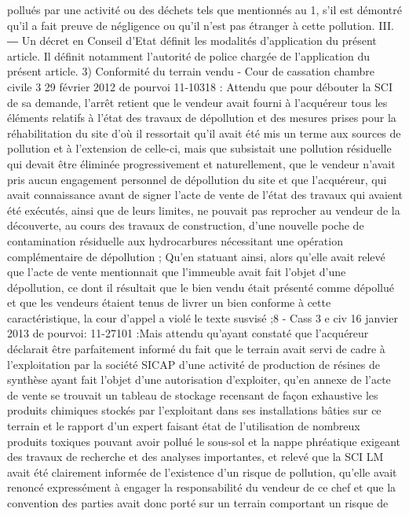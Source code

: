 \documentclass[11pt,a4paper]{report}
\begin{document}
	pollués par une activité ou des déchets tels que mentionnés au 1\degre , s'il est démontré qu'il a fait preuve de
	négligence ou qu'il n'est pas étranger à cette pollution.
	III. ― Un décret en Conseil d'Etat définit les modalités d'application du présent article. Il définit notamment
	l'autorité de police chargée de l'application du présent article.
	3) Conformité du terrain vendu
	- Cour de cassation chambre civile 3 29 février 2012 \No  de pourvoi 11-10318 : Attendu que pour débouter
	la SCI de sa demande, l'arrêt retient que le vendeur avait fourni à l'acquéreur tous les éléments relatifs à l'état
	des travaux de dépollution et des mesures prises pour la réhabilitation du site d'où il ressortait qu'il avait été mis
	un terme aux sources de pollution et à l'extension de celle-ci, mais que subsistait une pollution résiduelle qui
	devait être éliminée progressivement et naturellement, que le vendeur n'avait pris aucun engagement personnel
	de dépollution du site et que l'acquéreur, qui avait connaissance avant de signer l'acte de vente de l'état des
	travaux qui avaient été exécutés, ainsi que de leurs limites, ne pouvait pas reprocher au vendeur de la
	découverte, au cours des travaux de construction, d'une nouvelle poche de contamination résiduelle aux
	hydrocarbures nécessitant une opération complémentaire de dépollution ;
	Qu'en statuant ainsi, alors qu'elle avait relevé que l'acte de vente mentionnait que l'immeuble avait fait l'objet
	d'une dépollution, ce dont il résultait que le bien vendu était présenté comme dépollué et que les vendeurs étaient
	tenus de livrer un bien conforme à cette caractéristique, la cour d'appel a violé le texte susvisé ;8
	- Cass 3 e civ 16 janvier 2013 \No  de pourvoi: 11-27101 :Mais attendu qu'ayant constaté que l'acquéreur
	déclarait être parfaitement informé du fait que le terrain avait servi de cadre à l'exploitation par la société
	SICAP d'une activité de production de résines de synthèse ayant fait l'objet d'une autorisation d'exploiter, qu'en
	annexe de l'acte de vente se trouvait un tableau de stockage recensant de façon exhaustive les produits
	chimiques stockés par l'exploitant dans ses installations bâties sur ce terrain et le rapport d'un expert faisant
	état de l'utilisation de nombreux produits toxiques pouvant avoir pollué le sous-sol et la nappe phréatique
	exigeant des travaux de recherche et des analyses importantes, et relevé que la SCI LM avait été clairement
	informée de l'existence d'un risque de pollution, qu'elle avait renoncé expressément à engager la responsabilité
	du vendeur de ce chef et que la convention des parties avait donc porté sur un terrain comportant un risque de
\end{document}
